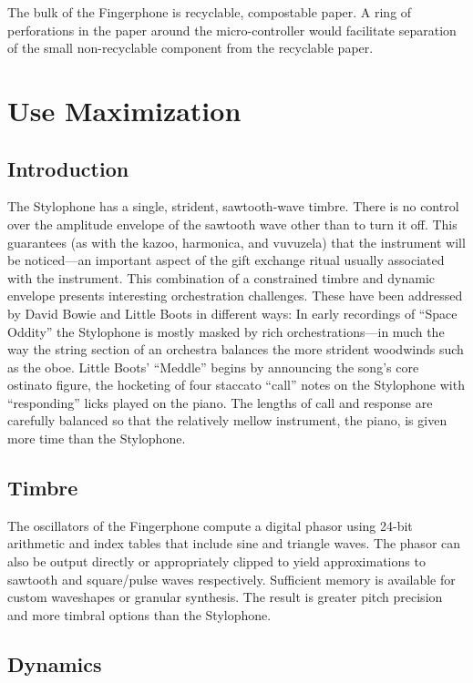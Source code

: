 The bulk of the Fingerphone is recyclable, compostable paper. A ring of
perforations in the paper around the micro-controller would facilitate separation
of the small non-recyclable component from the recyclable paper.

\section{Use Maximization}

\subsection{Introduction}

The Stylophone has a single, strident, sawtooth-wave timbre. There is no control
over the amplitude envelope of the sawtooth wave other than to turn it off. This
guarantees (as with the kazoo, harmonica, and vuvuzela) that the instrument will
be noticed---an important aspect of the gift exchange ritual usually associated
with the instrument. This combination of a constrained timbre and dynamic
envelope presents interesting orchestration challenges.  These have been
addressed by David Bowie and Little Boots in different ways: In early recordings
of ``Space Oddity'' the Stylophone is mostly masked by rich orchestrations---in
much the way the string section of an orchestra balances the more strident
woodwinds such as the oboe. Little Boots' ``Meddle'' begins by announcing the
song's core ostinato figure, the hocketing of four staccato ``call'' notes on the
Stylophone with ``responding'' licks played on the piano. The lengths of call and
response are carefully balanced so that the relatively mellow instrument, the
piano, is given more time than the Stylophone.

\subsection{Timbre}

The oscillators of the Fingerphone compute a digital phasor using 24-bit
arithmetic and index tables that include sine and triangle waves. The phasor can
also be output directly or appropriately clipped to yield approximations to
sawtooth and square/pulse waves respectively. Sufficient memory is available for
custom waveshapes or granular synthesis. The result is greater pitch precision
and more timbral options than the Stylophone.

\subsection{Dynamics }

